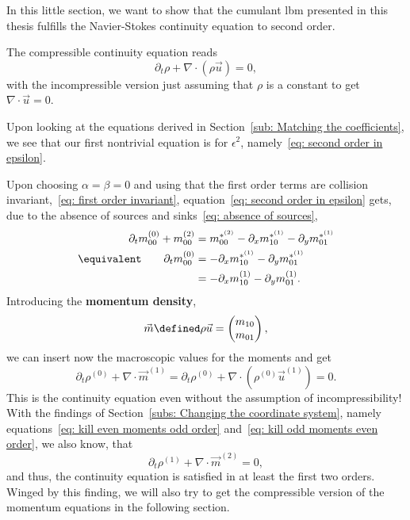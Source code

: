 In this little section, we want to show that the cumulant \gls{lbm} presented in this thesis fulfills the Navier-Stokes continuity equation to second order.

The compressible continuity equation reads
\begin{equation}
  \label{eq: continuity equation}
  \partial_t \rho + \nabla \cdot (\rho \vec{u}) = 0,
\end{equation}
with the incompressible version just assuming that $\rho$ is a constant to get $\nabla\cdot\vec{u}=0$.

Upon looking at the equations derived in Section~\ref{sub: Matching the coefficients}, we see that our first nontrivial equation is for $\epsilon^2$, namely~\eqref{eq: second order in epsilon}.

Upon choosing $\alpha=\beta=0$ and using that the first order terms are collision invariant,~\eqref{eq: first order invariant}, equation~\eqref{eq: second order in epsilon} gets, due to the absence of sources and sinks~\eqref{eq: absence of sources},
\begin{align}
  \nonumber
  \partial_t m_{00}^{(0)} + m_{00}^{(2)} & =  m_{00}^{*^{(2)}} - \partial_x m_{10}^{*^{(1)}} - \partial_y m_{01}^{*^{(1)}} \\
  \equivalent \qquad \partial_t m_{00}^{(0)} & =  - \partial_x m_{10}^{*^{(1)}} - \partial_y m_{01}^{*^{(1)}} \nonumber
  \\
  & =  - \partial_x m_{10}^{(1)} - \partial_y m_{01}^{(1)}.
  \label{eq: continuity moments}
\end{align}
Introducing the \textbf{momentum density},
\begin{equation}
  \vec{m} \defined \rho \vec{u} = \begin{pmatrix}m_{10} \\m_{01}  \end{pmatrix},
\end{equation}
we can insert now the macroscopic values for the moments and get
\begin{equation}
  \partial_t \rho^{(0)} + \nabla \cdot \vec{m}^{(1)} =
  \partial_t \rho^{(0)} + \nabla \cdot (\rho^{(0)} \vec{u}^{(1)}) = 0.
\end{equation}
This is the continuity equation even without the assumption of incompressibility!
With the findings of Section~\ref{subs: Changing the coordinate system},
namely equations~\eqref{eq: kill even moments odd order} and~\eqref{eq: kill odd moments even order}, we also know, that
\begin{equation}
  \label{eq: conti second order}
  \partial_t \rho^{(1)} + \nabla \cdot \vec{m}^{(2)} = 0,
\end{equation}
and thus, the continuity equation is satisfied in at least the first two orders.
Winged by this finding, we will also try to get the compressible version of the momentum equations in the following section.

